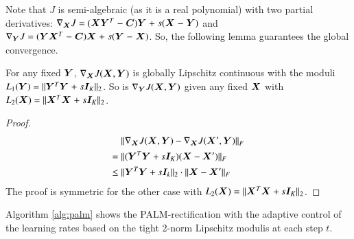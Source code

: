 Note that $J$ is semi-algebraic (as it is a real polynomial) with two partial
derivatives: $\nabla_{\bm{X}}J \mathrel{=} (\bm{X} \bm{Y}^T \mathrel{-} \bm{C})\bm{Y} \mathrel{+} s(\bm{X} \mathrel{-}
\bm{Y})$ and $\nabla_{\bm{Y}}J \mathrel{=} (\bm{Y} \bm{X}^T \mathrel{-} \bm{C})\bm{X} \mathrel{+} s(\bm{Y} \mathrel{-} \bm{X})$.
So, the following lemma guarantees the global convergence.
\begin{lemma}
  For any fixed $\bm{Y}$, $\nabla_{\bm{X}}J(\bm{X}, \bm{Y})$ is globally Lipschitz 
  continuous with the moduli $L_1(\bm{Y}) \mathrel{=} \| \bm{Y}^T \bm{Y} \mathrel{+} s\bm{I}_K \|_2$. So 
  is $\nabla_{\bm{Y}}J(\bm{X}, \bm{Y})$ given any fixed $\bm{X}$ with $L_2(\bm{X}) \mathrel{=} \| \bm{X}^T
  \bm{X} \mathrel{+} s\bm{I}_K \|_2$.
\end{lemma}
\begingroup
\allowdisplaybreaks
\begin{proof}
	\begin{align*}
		&\| \nabla_{\bm{X}}J(\bm{X}, \bm{Y}) - \nabla_{\bm{X}}J(\bm{X}', \bm{Y}) \|_F \\
		\mathrel{=}{} & \|(\bm{Y}^T\bm{Y} + s\bm{I}_K)(\bm{X} - \bm{X}')\|_F \\
		\leq{} & \|\bm{Y}^T \bm{Y} + s\bm{I}_k\|_2 \cdot\|\bm{X} - \bm{X}'\|_F
	\end{align*} 
	The proof is symmetric for the other case with $L_2(\bm{X}) = \| \bm{X}^T \bm{X}
	+ s\bm{I}_K \|_2$.
\end{proof}
\endgroup
Algorithm \ref{alg:palm} shows the PALM-rectification with the adaptive control
of the learning rates based on the tight 2-norm Lipschitz modulis at each step
$t$.